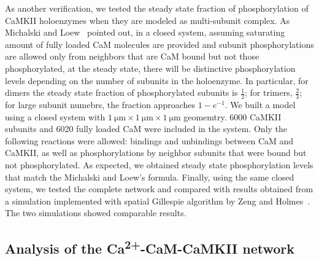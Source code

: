 \documentclass[10pt,letterpaper]{article}
\begin{document}
As another verification, we tested the steady state fraction of phosphorylation of CaMKII holoenzymes when they are modeled as multi-subunit complex. As Michalski and Loew~\cite{Michalski:2012ds} pointed out, in a closed system, assuming saturating amount of fully loaded CaM molecules are provided and subunit phosphorylations are allowed only from neighbors that are CaM bound but not those phosphorylated, at the steady state, there will be distinctive phosphorylation levels depending on the number of subunits in the holoenzyme. In particular, for dimers the steady state fraction of phosphorylated subunits is $\frac{1}{2}$; for trimers, $\frac{2}{3}$; for large subunit numebrs, the fraction approaches $1-e^{-1}$. We built a model using a closed system with $\SI{1}{\um}\times\SI{1}{\um}\times\SI{1}{\um}$ geomemtry. 6000 CaMKII subunits and 6020 fully loaded CaM were included in the system. Only the following reactions were allowed: bindings and unbindings between CaM and CaMKII, as well as phosphorylations by neighbor subunits that were bound but not phosphorylated. As expected, we obtained steady state phosphorylation levels that match the Michalski and Loew's formula. Finally, using the same closed system, we tested the complete network and compared with results obtained from a simulation implemented with spatial Gillespie algorithm by Zeng and Holmes~\cite{Zeng:2010bq}. The two simulations showed comparable results.

\subsection*{Analysis of the Ca\textsuperscript{2+}-CaM-CaMKII network}
\end{document}
